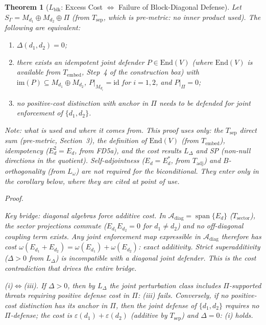 \documentclass[11pt,a4paper]{article}
\newtheorem{theorem}{Theorem}[section]
\theoremstyle{definition}
\newcommand{\eps}{\varepsilon}
\newcommand{\End}{\mathrm{End}}
\newcommand{\im}{\mathrm{im}}
\DeclareMathOperator{\spn}{span}
\begin{document}
\begin{theorem}[$L_{\mathrm{blk}}$: Excess Cost $\Leftrightarrow$ Failure of Block-Diagonal Defense]\label{thm:Lblk}
Let $S_\Gamma = M_{d_1} \oplus M_{d_2} \oplus \Pi$ (from $T_{\mathrm{sep}}$, which is pre-metric: no inner product used).  The following are equivalent:
\begin{enumerate}[nosep,label=(\roman*)]
\item $\Delta(d_1, d_2) = 0$;
\item there exists an idempotent joint defender $P \in \End(V)$ (where $\End(V)$ is available from $T_{\mathrm{embed}}$, Step~4 of the construction box) with $\im(P) \subseteq M_{d_1} \oplus M_{d_2}$, $P|_{M_{d_i}} = \mathrm{id}$ for $i = 1,2$, and $P|_\Pi = 0$;
\item no positive-cost distinction with anchor in $\Pi$ needs to be defended for joint enforcement of $\{d_1, d_2\}$.
\end{enumerate}

\smallskip\noindent\textit{Note: what is used and where it comes from.}  This proof uses only: the $T_{\mathrm{sep}}$ direct sum (pre-metric, Section~3), the definition of $\End(V)$ (from $T_{\mathrm{embed}}$), idempotency ($E_d^2 = E_d$, from FD5a), and the cost results $L_\Delta$ and SP (non-null directions in the quotient).  Self-adjointness ($E_d = E_d^*$, from $T_{\mathrm{adj}}$) and $B$-orthogonality (from $L_\omega$) are \emph{not required} for the biconditional.  They enter only in the corollary below, where they are cited at point of use.

\smallskip\noindent\textit{Proof.}

\textit{Key bridge: diagonal algebras force additive cost.}  In $\mathcal{A}_{\mathrm{diag}} = \spn\{E_d\}$ ($T_{\mathrm{sector}}$), the sector projections commute ($E_{d_1} E_{d_2} = 0$ for $d_1 \ne d_2$) and no off-diagonal coupling term exists.  Any joint enforcement map expressible in $\mathcal{A}_{\mathrm{diag}}$ therefore has cost $\omega(E_{d_1} + E_{d_2}) = \omega(E_{d_1}) + \omega(E_{d_2})$: exact additivity.  Strict superadditivity ($\Delta > 0$ from $L_\Delta$) is incompatible with a diagonal joint defender.  This is the cost contradiction that drives the entire bridge.

\textit{(i)$\Leftrightarrow$(iii).}  If $\Delta > 0$, then by $L_\Delta$ the joint perturbation class includes $\Pi$-supported threats requiring positive defense cost in $\Pi$: (iii) fails.  Conversely, if no positive-cost distinction has its anchor in $\Pi$, then the joint defense of $\{d_1,d_2\}$ requires no $\Pi$-defense; the cost is $\eps(d_1) + \eps(d_2)$ (additive by $T_{\mathrm{sep}}$) and $\Delta = 0$: (i) holds.


\end{theorem}
\end{document}
